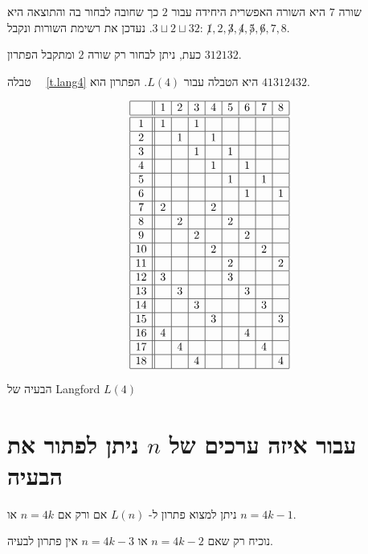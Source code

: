 שורה
$7$
היא השורה האפשרית היחידה עבור
$2$
כך שחובה לבחור בה והתוצאה היא
$3\sqcup  2\sqcup  3{}2$.
נעדכן את רשימת השורות ונקבל:
$\not 1,2,\not 3,\not 4,\not 5, \not 6, 7, 8$.

כעת, ניתן לבחור רק שורה
$2$
ומתקבל הפתרון
$3{}1{}2{}1{}3{}2$.

טבלה~%
~\ref{t.lang4}
היא הטבלה עבור
$L(4)$.
הפתרון הוא
$41312432$.

\begin{table}
\[
\begin{array}{|c||c|c|c|c|c|c|c|c|}
\hline
&1&2&3&4&5&6&7&8\\\hline\hline
1&1&&1&&&&&\\\hline
2&&1&&1&&&&\\\hline
3&&&1&&1&&&\\\hline
4&&&&1&&1&&\\\hline
5&&&&&1&&1&\\\hline
6&&&&&&1&&1\\\hline
7&2&&&2&&&&\\\hline
8&&2&&&2&&&\\\hline
9&&&2&&&2&&\\\hline
10&&&&2&&&2&\\\hline
11&&&&&2&&&2\\\hline
12&3&&&&3&&&\\\hline
13&&3&&&&3&&\\\hline
14&&&3&&&&3&\\\hline
15&&&&3&&&&3\\\hline
16&4&&&&&4&&\\\hline
17&&4&&&&&4&\\\hline
18&&&4&&&&&4\\\hline
\end{array}
\]
\caption{הבעיה של Langford $L(4)$}\label{t.lang4}
\end{table}

\section{
עבור איזה ערכים של
$n$
ניתן לפתור את הבעיה}
\label{s.langford-theorem}

\begin{theorem}
ניתן למצוא פתרון ל-%
$L(n)$
אם ורק אם
$n=4k$
או
$n=4k-1$.
\end{theorem}
נוכיח רק שאם 
$n=4k-2$
או
$n=4k-3$
אין פתרון לבעיה.

